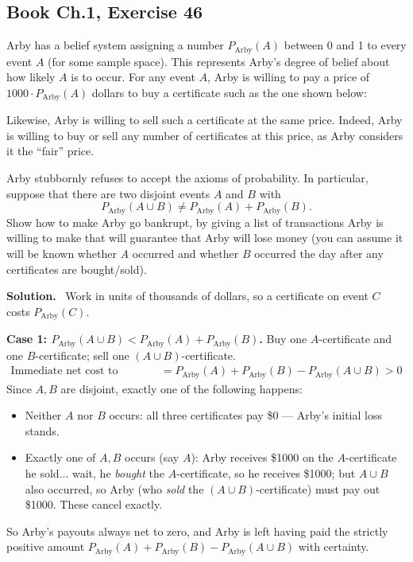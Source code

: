 \documentclass[11pt]{article}
\newcommand{\Sol}{\vspace{2pt}\noindent\textbf{Solution.}\ }
\begin{document}
\subsection{Book Ch.1, Exercise 46}
\begin{qbox}
Arby has a belief system assigning a number $P_{\text{Arby}}(A)$ between 0 and 1 to every event $A$ (for some sample space). This represents Arby's degree of belief about how likely $A$ is to occur. For any event $A$, Arby is willing to pay a price of $1000\cdot P_{\text{Arby}}(A)$ dollars to buy a certificate such as the one shown below:

\medskip
{}
\medskip

Likewise, Arby is willing to sell such a certificate at the same price. Indeed, Arby is willing to buy or sell any number of certificates at this price, as Arby considers it the ``fair'' price.

Arby stubbornly refuses to accept the axioms of probability. In particular, suppose that there are two disjoint events $A$ and $B$ with
\[
P_{\text{Arby}}(A\cup B) \ne P_{\text{Arby}}(A) + P_{\text{Arby}}(B).
\]
Show how to make Arby go bankrupt, by giving a list of transactions Arby is willing to make that will guarantee that Arby will lose money (you can assume it will be known whether $A$ occurred and whether $B$ occurred the day after any certificates are bought/sold).
\end{qbox}
\Sol
Work in units of thousands of dollars, so a certificate on event $C$ costs $P_{\text{Arby}}(C)$.

\textbf{Case 1: $P_{\text{Arby}}(A\cup B) < P_{\text{Arby}}(A)+P_{\text{Arby}}(B)$.}
Buy one $A$-certificate and one $B$-certificate; sell one $(A\cup B)$-certificate.
\begin{align*}
\text{Immediate net cost to Arby's counterparty} &= P_{\text{Arby}}(A)+P_{\text{Arby}}(B) - P_{\text{Arby}}(A\cup B) > 0
\end{align*}
Since $A,B$ are disjoint, exactly one of the following happens:
\begin{itemize}[leftmargin=1.3em]
\item Neither $A$ nor $B$ occurs: all three certificates pay \$0 — Arby's initial loss stands.
\item Exactly one of $A,B$ occurs (say $A$): Arby receives \$1000 on the $A$-certificate he sold... wait, he \emph{bought} the $A$-certificate, so he receives \$1000; but $A\cup B$ also occurred, so Arby (who \emph{sold} the $(A\cup B)$-certificate) must pay out \$1000. These cancel exactly.
\end{itemize}
So Arby's payouts always net to zero, and Arby is left having paid the strictly positive amount $P_{\text{Arby}}(A)+P_{\text{Arby}}(B)-P_{\text{Arby}}(A\cup B)$ with certainty.
\end{document}
